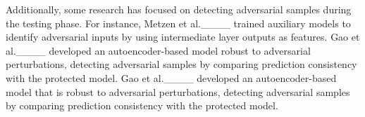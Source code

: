 Additionally, some research has focused on detecting adversarial samples during the testing phase. For instance, Metzen et al.____ trained auxiliary models to identify adversarial inputs by using intermediate layer outputs as features. Gao et al.____ developed an autoencoder-based model robust to adversarial perturbations, detecting adversarial samples by comparing prediction consistency with the protected model.
Gao et al.____ developed an autoencoder-based model that is robust to adversarial perturbations, detecting adversarial samples by comparing prediction consistency with the protected model.

